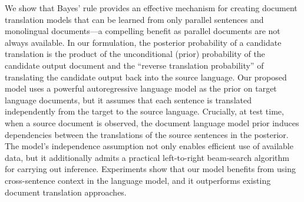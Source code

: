 We show that Bayes' rule provides an effective mechanism for creating document translation models that can be learned from only parallel sentences and monolingual documents---a compelling benefit as parallel documents are not always available. In our formulation, the posterior probability of a candidate translation is the product of the unconditional (prior) probability of the candidate output document and the ``reverse translation  probability'' of translating the candidate output back into the source language. Our proposed model uses a powerful autoregressive language model as the prior on target language documents, but it assumes that each sentence is translated independently from the target to the source language. Crucially, at test time, when a source document is observed, the document language model prior induces dependencies between the translations of the source sentences in the posterior. The model's independence assumption not only enables efficient use of available data, but it additionally admits a practical left-to-right beam-search algorithm for carrying out inference. Experiments show that our model benefits from using cross-sentence context in the language model, and it outperforms existing document translation approaches.